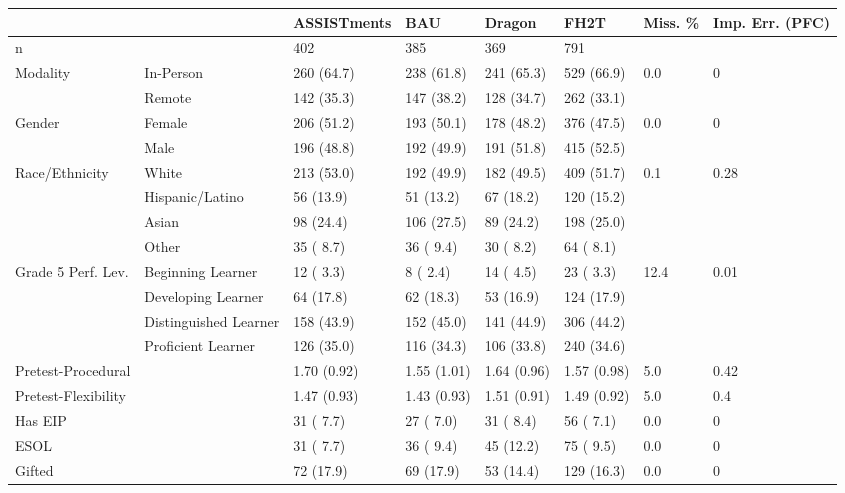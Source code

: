 \begin{sidewaystable}[ht]
\centering
\begin{tabular}{llllllll}
  \hline
  &   & ASSISTments & BAU & Dragon & FH2T & Miss. \% & Imp. Err. (PFC) \\ 
  \hline
n &  &  402 &  385 &  369 &  791 &      &  \\ 
  Modality & In-Person &  260 (64.7)  &  238 (61.8)  &  241 (65.3)  &  529 (66.9)  &  0.0 & 0 \\ 
   & Remote &  142 (35.3)  &  147 (38.2)  &  128 (34.7)  &  262 (33.1)  &      &  \\ 
  Gender & Female &  206 (51.2)  &  193 (50.1)  &  178 (48.2)  &  376 (47.5)  &  0.0 & 0 \\ 
   & Male &  196 (48.8)  &  192 (49.9)  &  191 (51.8)  &  415 (52.5)  &      &  \\ 
  Race/Ethnicity & White &  213 (53.0)  &  192 (49.9)  &  182 (49.5)  &  409 (51.7)  &  0.1 & 0.28 \\ 
   & Hispanic/Latino &   56 (13.9)  &   51 (13.2)  &   67 (18.2)  &  120 (15.2)  &      &  \\ 
   & Asian &   98 (24.4)  &  106 (27.5)  &   89 (24.2)  &  198 (25.0)  &      &  \\ 
   & Other &   35 ( 8.7)  &   36 ( 9.4)  &   30 ( 8.2)  &   64 ( 8.1)  &      &  \\ 
  Grade 5 Perf. Lev. & Beginning Learner &   12 ( 3.3)  &    8 ( 2.4)  &   14 ( 4.5)  &   23 ( 3.3)  & 12.4 & 0.01 \\ 
   & Developing Learner &   64 (17.8)  &   62 (18.3)  &   53 (16.9)  &  124 (17.9)  &      &  \\ 
   & Distinguished Learner &  158 (43.9)  &  152 (45.0)  &  141 (44.9)  &  306 (44.2)  &      &  \\ 
   & Proficient Learner &  126 (35.0)  &  116 (34.3)  &  106 (33.8)  &  240 (34.6)  &      &  \\ 
  Pretest-Procedural &  & 1.70 (0.92) & 1.55 (1.01) & 1.64 (0.96) & 1.57 (0.98) &  5.0 & 0.42 \\ 
  Pretest-Flexibility &  & 1.47 (0.93) & 1.43 (0.93) & 1.51 (0.91) & 1.49 (0.92) &  5.0 & 0.4 \\ 
  Has EIP &  &  31 ( 7.7)  &  27 ( 7.0)  &  31 ( 8.4)  &  56 ( 7.1)  &  0.0 & 0 \\ 
  ESOL &  &  31 ( 7.7)  &  36 ( 9.4)  &  45 (12.2)  &  75 ( 9.5)  &  0.0 & 0 \\ 
  Gifted &  &  72 (17.9)  &  69 (17.9)  &  53 (14.4)  & 129 (16.3)  &  0.0 & 0 \\ 

\end{tabular}
\end{sidewaystable}
